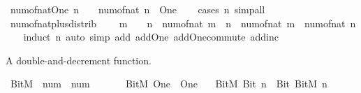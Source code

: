 \begin{isabellebody}
\begin{isamarkuptext}
\end{isamarkuptext}\isamarkuptrue%
\isamarkupfalse%
\ num{\isacharunderscore}{\kern0pt}of{\isacharunderscore}{\kern0pt}nat{\isacharunderscore}{\kern0pt}One{\isacharcolon}{\kern0pt}\ {\isachardoublequoteopen}n\ {\isasymle}\ {}\ {\isasymLongrightarrow}\ num{\isacharunderscore}{\kern0pt}of{\isacharunderscore}{\kern0pt}nat\ n\ {\isacharequal}{\kern0pt}\ One{\isachardoublequoteclose}\isanewline
%
\isadelimproof
\ \ %
\endisadelimproof
%
\isatagproof
{}\isamarkupfalse%
\ {\isacharparenleft}{\kern0pt}cases\ n{\isacharparenright}{\kern0pt}\ simp{\isacharunderscore}{\kern0pt}all%
\endisatagproof
{\isafoldproof}%
%
\isadelimproof
\isanewline
%
\endisadelimproof
\isanewline
{}\isamarkupfalse%
\ num{\isacharunderscore}{\kern0pt}of{\isacharunderscore}{\kern0pt}nat{\isacharunderscore}{\kern0pt}plus{\isacharunderscore}{\kern0pt}distrib{\isacharcolon}{\kern0pt}\isanewline
\ \ {\isachardoublequoteopen}{}\ {\isacharless}{\kern0pt}\ m\ {\isasymLongrightarrow}\ {}\ {\isacharless}{\kern0pt}\ n\ {\isasymLongrightarrow}\ num{\isacharunderscore}{\kern0pt}of{\isacharunderscore}{\kern0pt}nat\ {\isacharparenleft}{\kern0pt}m\ {\isacharplus}{\kern0pt}\ n{\isacharparenright}{\kern0pt}\ {\isacharequal}{\kern0pt}\ num{\isacharunderscore}{\kern0pt}of{\isacharunderscore}{\kern0pt}nat\ m\ {\isacharplus}{\kern0pt}\ num{\isacharunderscore}{\kern0pt}of{\isacharunderscore}{\kern0pt}nat\ n{\isachardoublequoteclose}\isanewline
%
\isadelimproof
\ \ %
\endisadelimproof
%
\isatagproof
{}\isamarkupfalse%
\ {\isacharparenleft}{\kern0pt}induct\ n{\isacharparenright}{\kern0pt}\ {\isacharparenleft}{\kern0pt}auto\ simp\ add{\isacharcolon}{\kern0pt}\ add{\isacharunderscore}{\kern0pt}One\ add{\isacharunderscore}{\kern0pt}One{\isacharunderscore}{\kern0pt}commute\ add{\isacharunderscore}{\kern0pt}inc{\isacharparenright}{\kern0pt}%
\endisatagproof
{\isafoldproof}%
%
\isadelimproof
%
\endisadelimproof
%
\begin{isamarkuptext}%
A double-and-decrement function.%
\end{isamarkuptext}\isamarkuptrue%
\isamarkupfalse%
\ BitM\ {\isacharcolon}{\kern0pt}{\isacharcolon}{\kern0pt}\ {\isachardoublequoteopen}num\ {\isasymRightarrow}\ num{\isachardoublequoteclose}\isanewline
\ \ \isanewline
\ \ \ \ {\isachardoublequoteopen}BitM\ One\ {\isacharequal}{\kern0pt}\ One{\isachardoublequoteclose}\isanewline
\ \ {\isacharbar}{\kern0pt}\ {\isachardoublequoteopen}BitM\ {\isacharparenleft}{\kern0pt}Bit{}\ n{\isacharparenright}{\kern0pt}\ {\isacharequal}{\kern0pt}\ Bit{}\ {\isacharparenleft}{\kern0pt}BitM\ n{\isacharparenright}{\kern0pt}{\isachardoublequoteclose}\isanewline

\end{isabellebody}
